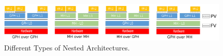 \documentclass{sig-alternate}
\begin{document}
%
%

\begin{figure}
\begin{center}
\includegraphics[width=2\columnwidth]{globalcut.png}
\end{center}
\caption{Different Types of Nested Architectures.}
\label{fig:io}
\end{figure}
\end{document}
